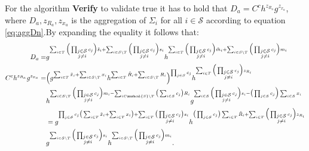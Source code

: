 For the algorithm \textbf{Verify} to validate true it has to hold that $D_a=C^ch^{z_{R_a}}g^{z_{x_a}}$, where $D_a,z_{R_a},z_{x_a}$ is the aggregation of $\Sigma_i$ for all $i\in\mathcal{S}$  according to equation \eqref{eq:aggDn}.By expanding the equality it follows that:
\begin{align*}
D_a =& g ^ {\sum_{i\in T } \Big(\prod_{\substack{j\in\mathcal{S}\\ j\neq i}}   c_j \Big)\tilde{s}_i + \sum_{i\in\mathcal{S}\backslash T } \Big(\prod_{\substack{j\in\mathcal{S}\\ j\neq i}}   c_j \Big)s_i} h^ {\sum_{i\in T } \Big(\prod_{\substack{j\in\mathcal{S}\\ j\neq i}}    c_j \Big)\tilde{m}_i+ \sum_{i\in\mathcal{S}\backslash T} \Big(\prod_{\substack{j\in\mathcal{S}\\ j\neq i}}    c_j \Big)m_i} 
 \\
 C^ch^{z_{R_a}}g^{z_{x_a}} =&   \Big( g^{\sum_{i\in T} \tilde{x}_i + \sum_{i\in \mathcal{S}\backslash T} x_i} h^{\sum_{i\in T} \tilde{R}_i + \sum_{i\in \mathcal{S}\backslash T} R_i}  \Big) ^{\prod_{j\in\mathcal{S}} c_j}  h^{ \sum_{i\in T } \Big( \prod_{\substack{j\in\mathcal{S}\\ j\neq i}} c_j \Big) z_{R_i}}
 \\
& h^{\sum_{i\in\mathcal{S}\backslash T } \Big( \prod_{\substack{j\in\mathcal{S}\\ j\neq i}}   c_j \Big)m_i- \sum_{i\in\marhcal{S}\backslash T} \big( \sum_{i\in\mathcal{S}} c_j\big)R_i}  
g^{ \sum_{i\in\mathcal{S}} \Big( \prod_{\substack{j\in\mathcal{S}\\ j\neq i}}   c_j \Big)s_i - \big( \prod_{j\in\mathcal{S}} c_j \Big) \sum_{i\in\mathcal{S}} x_i}
\\ 
 &=  g ^{\prod_{j\in\mathcal{S}} c_j \big(\sum_{i\in T} \tilde{x}_i + \sum_{i\in T} x_i\big) +  \sum_{i\in T} \big( \prod_{\substack{j\in\mathcal{S}\\ j\neq i}} c_j\big) s_i     } h^{ \big( \prod_{j\in\mathcal{S}} c_j\big)\sum_{i\in T} \tilde{R}_i  + \sum_{i\in T } \Big( \prod_{\substack{j\in\mathcal{S}\\ j\neq i}} c_j \Big) z_{R_i}}
 \\
 & g ^ {\sum_{i\in\mathcal{S}\backslash T } \Big(\prod_{\substack{j\in\mathcal{S}\\ j\neq i}}   c_j \Big)s_i} h^ { \sum_{i\in\mathcal{S}\backslash T} \Big(\prod_{\substack{j\in\mathcal{S}\\ j\neq i}}    c_j \Big)m_i} .
\end{align*}
